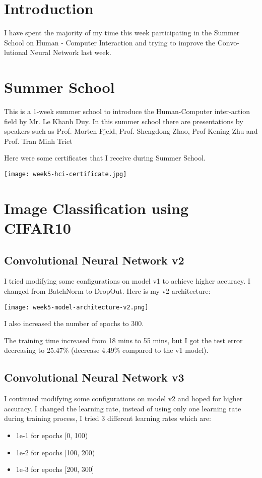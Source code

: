 \section{Introduction}
I have spent the majority of my time this week participating in the Summer School on Human - Computer Interaction and trying to improve the Convo-lutional Neural Network last week.

\section{Summer School}
This is a 1-week summer school to introduce the Human-Computer inter-action field by Mr. Le Khanh Duy. In this summer school there are presentations by speakers such as Prof. Morten Fjeld, Prof. Shengdong Zhao, Prof Kening Zhu and Prof. Tran Minh Triet

Here were some certificates that I receive during Summer School.

\begin{center}
\texttt{[image: week5-hci-certificate.jpg]}
\end{center}

\section{Image Classification using CIFAR10}
\subsection{Convolutional Neural Network v2}
I tried modifying some configurations on model v1 to achieve higher accuracy. I changed from BatchNorm\cite{batchnorm} to DropOut. Here is my v2 architecture:
\begin{center}
\texttt{[image: week5-model-architecture-v2.png]}
\end{center}

I also increased the number of epochs to 300.

The training time increased from 18 mins to 55 mins, but I got the test error decreasing to 25.47\% (decrease 4.49\% compared to the v1 model).

\subsection{Convolutional Neural Network v3}
I continued modifying some configurations on model v2 and hoped for higher accuracy. I changed the learning rate, instead of using only one learning rate during training process, I tried 3 different learning rates which are:
\begin{itemize}
\item 1e-1 for epochs [0, 100)
\item 1e-2 for epochs [100, 200)
\item 1e-3 for epochs [200, 300]
\end{itemize}

